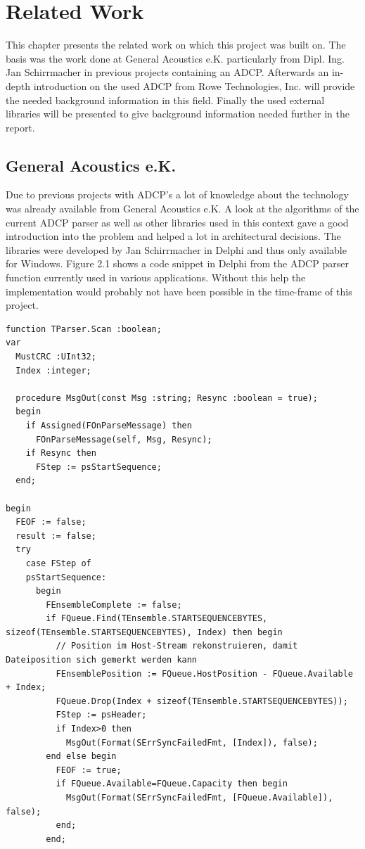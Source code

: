 \chapter{Related Work}
This chapter presents the related work on which this project was built on. The basis was the work done at General Acoustics e.K. particularly from Dipl. Ing. Jan Schirrmacher in previous projects containing an ADCP. Afterwards an in-depth introduction on the used ADCP from Rowe Technologies, Inc. will provide the needed background information in this field. Finally the used external libraries will be presented to give background information needed further in the report.

\section{General Acoustics e.K.}
Due to previous projects with ADCP's a lot of knowledge about the technology was already available from General Acoustics e.K. A look at the algorithms of the current ADCP parser as well as other libraries used in this context gave a good introduction into the problem and helped a lot in architectural decisions. The libraries were developed by Jan Schirrmacher in Delphi and thus only available for Windows. Figure 2.1 shows a code snippet in Delphi from the ADCP parser function currently used in various applications. Without this help the implementation would probably not have been possible in the time-frame of this project.
\begin{lstlisting}[language=Delphi, caption=A part from the implementation of the ADCP parser from Jan Schirrmacher]
function TParser.Scan :boolean;
var
  MustCRC :UInt32;
  Index :integer;

  procedure MsgOut(const Msg :string; Resync :boolean = true);
  begin
    if Assigned(FOnParseMessage) then
      FOnParseMessage(self, Msg, Resync);
    if Resync then
      FStep := psStartSequence;
  end;

begin
  FEOF := false;
  result := false;
  try
    case FStep of
    psStartSequence:
      begin
        FEnsembleComplete := false;
        if FQueue.Find(TEnsemble.STARTSEQUENCEBYTES, sizeof(TEnsemble.STARTSEQUENCEBYTES), Index) then begin
          // Position im Host-Stream rekonstruieren, damit Dateiposition sich gemerkt werden kann
          FEnsemblePosition := FQueue.HostPosition - FQueue.Available + Index;
          FQueue.Drop(Index + sizeof(TEnsemble.STARTSEQUENCEBYTES));
          FStep := psHeader;
          if Index>0 then
            MsgOut(Format(SErrSyncFailedFmt, [Index]), false);
        end else begin
          FEOF := true;
          if FQueue.Available=FQueue.Capacity then begin
            MsgOut(Format(SErrSyncFailedFmt, [FQueue.Available]), false);
          end;
        end;
\end{lstlisting}

